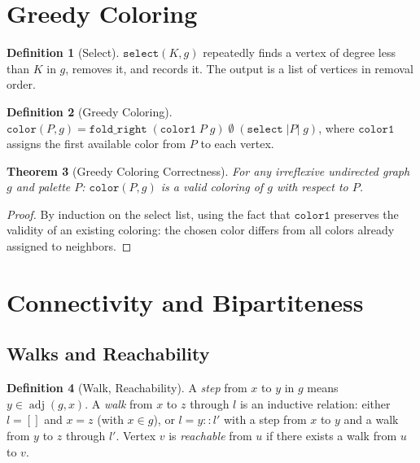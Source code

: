 \documentclass[11pt]{article}
\theoremstyle{plain}
\newtheorem{theorem}{Theorem}[section]
\theoremstyle{definition}
\newtheorem{definition}[theorem]{Definition}
\theoremstyle{remark}
\newcommand{\adj}{\operatorname{adj}}
\begin{document}
\section{Greedy Coloring}
\label{sec:greedy}

\begin{definition}[Select]
$\texttt{select}(K, g)$ repeatedly finds a vertex of degree less than $K$ in $g$, removes it, and records it. The output is a list of vertices in removal order.
\end{definition}

\begin{definition}[Greedy Coloring]
$\texttt{color}(P, g) = \texttt{fold\_right}\;(\texttt{color1}\; P\; g)\; \emptyset\; (\texttt{select}\;|P|\;g)$,
where $\texttt{color1}$ assigns the first available color from $P$ to each vertex.
\end{definition}

\begin{theorem}[Greedy Coloring Correctness]
\label{thm:greedy}
For any irreflexive undirected graph $g$ and palette $P$:
$\texttt{color}(P, g)$ is a valid coloring of $g$ with respect to $P$.
\end{theorem}

\begin{proof}
By induction on the select list, using the fact that $\texttt{color1}$ preserves the validity of an existing coloring: the chosen color differs from all colors already assigned to neighbors.
\end{proof}

\section{Connectivity and Bipartiteness}
\label{sec:bipartite}

\subsection{Walks and Reachability}

\begin{definition}[Walk, Reachability]
A \emph{step} from $x$ to $y$ in $g$ means $y \in \adj(g, x)$.
A \emph{walk} from $x$ to $z$ through $l$ is an inductive relation: either $l = []$ and $x = z$ (with $x \in g$), or $l = y :: l'$ with a step from $x$ to $y$ and a walk from $y$ to $z$ through $l'$.
Vertex $v$ is \emph{reachable} from $u$ if there exists a walk from $u$ to $v$.
\end{definition}
\end{document}
